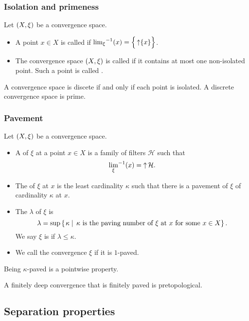 \subsubsection{Isolation and primeness}
\begin{definition}
Let $\left( X,\xi \right)$ be a convergence space.
\begin{itemize}
\item A point $x\in X$ is called  if ${\lim_\xi}^{-1}(x) = \Big\{ \mathop{\uparrow}\{x\} \Big\}$.
\item The convergence space $\left( X,\xi \right)$ is called  if it contains at most one non-isolated point. Such a point is called .
\end{itemize}
\end{definition}

A convergence space is discete if and only if each point is isolated. A discrete convergence space is prime.

\subsubsection{Pavement}
\begin{definition}
Let $\left( X,\xi \right)$ be a convergence space.
\begin{itemize}
\item A  of $\xi$ at a point $x\in X$ is a family of filters $\mathcal{H}$ such that
\[ {\lim_\xi}^{-1}(x) = \mathop{\uparrow}\mathcal{H}. \]
\item The  of $\xi$ at $x$ is the least cardinality $\kappa$ such that there is a pavement of $\xi$ of cardinality $\kappa$ at $x$.
\item The  $\lambda$ of $\xi$ is
\[ \lambda = \sup\left\{\left. \kappa \;\right|\; \text{$\kappa$ is the paving number of $\xi$ at $x$ for some $x\in X$} \right\}. \]
We say $\xi$ is  if $\lambda \leq \kappa$.
\item We call the convergence $\xi$  if it is $1$-paved.
\end{itemize}
\end{definition}
Being $\kappa$-paved is a pointwise property.

\begin{proposition}
A finitely deep convergence that is finitely paved is pretopological.
\end{proposition}

\subsection{Separation properties}
